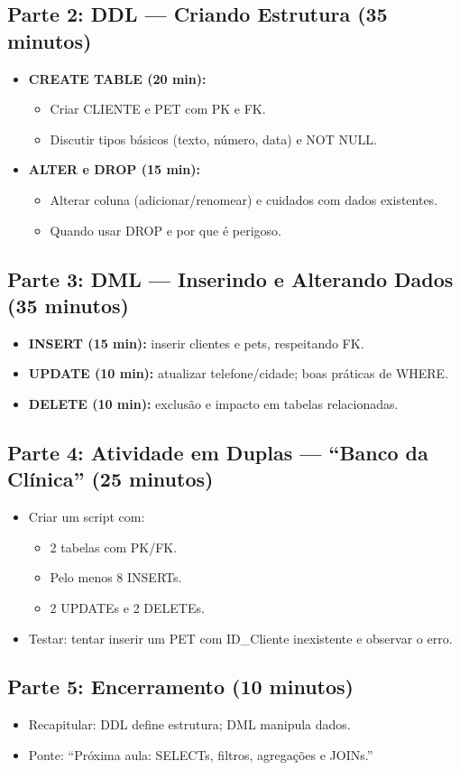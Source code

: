 \documentclass[12pt,a4paper]{article}
\begin{document}
\subsection*{Parte 2: DDL --- Criando Estrutura (35 minutos)}
\begin{itemize}[leftmargin=*,itemsep=0.35em]
  \item \textbf{CREATE TABLE (20 min):}
  \begin{itemize}[leftmargin=*,itemsep=0.25em]
    \item Criar CLIENTE e PET com PK e FK.
    \item Discutir tipos básicos (texto, número, data) e NOT NULL.
  \end{itemize}
  \item \textbf{ALTER e DROP (15 min):}
  \begin{itemize}[leftmargin=*,itemsep=0.25em]
    \item Alterar coluna (adicionar/renomear) e cuidados com dados existentes.
    \item Quando usar DROP e por que é perigoso.
  \end{itemize}
\end{itemize}

\subsection*{Parte 3: DML --- Inserindo e Alterando Dados (35 minutos)}
\begin{itemize}[leftmargin=*,itemsep=0.35em]
  \item \textbf{INSERT (15 min):} inserir clientes e pets, respeitando FK.
  \item \textbf{UPDATE (10 min):} atualizar telefone/cidade; boas práticas de WHERE.
  \item \textbf{DELETE (10 min):} exclusão e impacto em tabelas relacionadas.
\end{itemize}

\subsection*{Parte 4: Atividade em Duplas --- ``Banco da Clínica'' (25 minutos)}
\begin{itemize}[leftmargin=*,itemsep=0.35em]
  \item Criar um script com:
  \begin{itemize}[leftmargin=*,itemsep=0.25em]
    \item 2 tabelas com PK/FK.
    \item Pelo menos 8 INSERTs.
    \item 2 UPDATEs e 2 DELETEs.
  \end{itemize}
  \item Testar: tentar inserir um PET com ID\_Cliente inexistente e observar o erro.
\end{itemize}

\subsection*{Parte 5: Encerramento (10 minutos)}
\begin{itemize}[leftmargin=*,itemsep=0.35em]
  \item Recapitular: DDL define estrutura; DML manipula dados.
  \item Ponte: ``Próxima aula: SELECTs, filtros, agregações e JOINs.''
\end{itemize}
\end{document}

